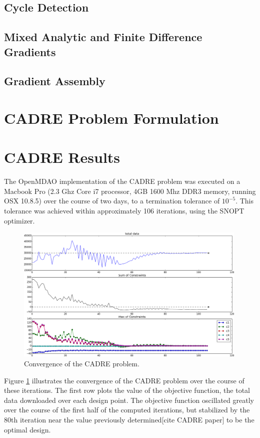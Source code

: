 \documentclass[]{aiaa-tc} %
\begin{document}
    \subsection{Cycle Detection}
    \subsection{Mixed Analytic and Finite Difference Gradients}
    \subsection{Gradient Assembly}

  \section{CADRE Problem Formulation}

  \section{CADRE Results}

The OpenMDAO implementation of the CADRE problem was executed on a Macbook Pro (2.3 Ghz Core i7 processor, 4GB 1600 Mhz DDR3 memory, running OSX 10.8.5)
over the course of two days, to a termination tolerance of $10^{-5}$. This tolerance
was achieved within approximately 106 iterations, using the SNOPT\cite{gill2005snopt}
optimizer.

\begin{figure}
\centering
\includegraphics[width=0.99\textwidth]{images/opt.png}
\caption[width=0.22\textwidth]{Convergence of the CADRE problem.}
\label{convergence}
\end{figure}


Figure \ref{convergence} illustrates the convergence of the CADRE problem over the course of
these iterations. The first row plots the
value of the objective function, the total data downloaded over each design point. The objective
function oscillated greatly over the course of the first half of the computed iterations, but
stabilized by the 80th iteration near the value previously determined[cite CADRE paper]
to be the optimal design.
\end{document}
